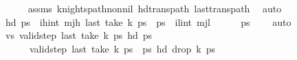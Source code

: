 \begin{isabellebody}
\ \ \ \ \isamarkupfalse%
\ assms\ knights{\isacharunderscore}{\kern0pt}path{\isacharunderscore}{\kern0pt}non{\isacharunderscore}{\kern0pt}nil\ hd{\isacharunderscore}{\kern0pt}trans{\isacharunderscore}{\kern0pt}path\ last{\isacharunderscore}{\kern0pt}trans{\isacharunderscore}{\kern0pt}path\ \isamarkupfalse%
\ auto\isanewline
\ \ \isamarkupfalse%
\ \isamarkupfalse%
\ {\isachardoublequoteopen}hd\ {\isacharquery}{\kern0pt}ps\ {\isacharequal}{\kern0pt}\ {\isacharparenleft}{\kern0pt}i\isactrlsub h{\isacharcomma}{\kern0pt}int\ mj\isactrlsub h{\isacharparenright}{\kern0pt}{\isachardoublequoteclose}\ {\isachardoublequoteopen}last\ {\isacharparenleft}{\kern0pt}{\isacharparenleft}{\kern0pt}take\ k\ ps\ {\isacharat}{\kern0pt}\ {\isacharquery}{\kern0pt}ps\ {\isacharequal}{\kern0pt}\ {\isacharparenleft}{\kern0pt}i\isactrlsub l{\isacharcomma}{\kern0pt}int\ mj\isactrlsub l{\isacharparenright}{\kern0pt}{\isachardoublequoteclose}\isanewline
\ \ \ \ \isamarkupfalse%
\ {\isacartoucheopen}{\isacharquery}{\kern0pt}ps\ {\isasymnoteq}\ {\isacharbrackleft}{\kern0pt}{\isacharbrackright}{\kern0pt}{\isacartoucheclose}\ \isamarkupfalse%
\ auto\isanewline
\ \ \isamarkupfalse%
\ \isamarkupfalse%
\ vs{\isacharcolon}{\kern0pt}\ {\isachardoublequoteopen}valid{\isacharunderscore}{\kern0pt}step\ {\isacharparenleft}{\kern0pt}last\ {\isacharparenleft}{\kern0pt}take\ k\ ps\ {\isacharparenleft}{\kern0pt}hd\ {\isacharquery}{\kern0pt}ps\ \isanewline
\ \ \ \ \ \ {\isachardoublequoteopen}valid{\isacharunderscore}{\kern0pt}step\ {\isacharparenleft}{\kern0pt}last\ {\isacharparenleft}{\kern0pt}{\isacharparenleft}{\kern0pt}take\ k\ ps\ {\isacharat}{\kern0pt}\ {\isacharquery}{\kern0pt}ps\ {\isacharparenleft}{\kern0pt}hd\ {\isacharparenleft}{\kern0pt}drop\ k\ ps\isanewline

\end{isabellebody}
